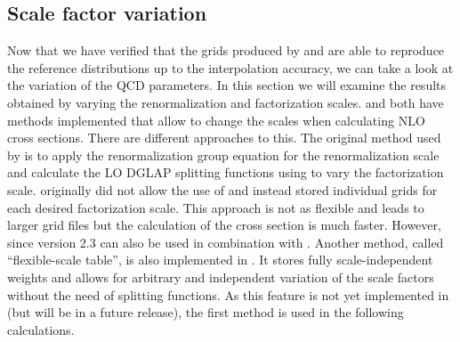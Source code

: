 \subsection{Scale factor variation}
\label{sec:scalesvar}
Now that we have verified that the grids produced by \appl{} and \fnlo{} are able to reproduce the reference distributions up to the interpolation accuracy, we can take a look at the variation of the QCD parameters.
In this section we will examine the results obtained by varying the renormalization and factorization scales.
\appl{} and \fnlo{} both have methods implemented that allow to change the scales when calculating NLO cross sections.
There are different approaches to this.
The original method used by \appl{} is to apply the renormalization group equation for the renormalization scale and calculate the LO DGLAP splitting functions using \hoppet{} \cite{hoppet} to vary the factorization scale.
\fnlo{} originally did not allow the use of \hoppet{} and instead stored individual grids for each desired factorization scale.
This approach is not as flexible and leads to larger grid files but the calculation of the cross section is much faster.
However, since version 2.3 \fnlo{} can also be used in combination with \hoppet{}.
Another method, called \enquote{flexible-scale table}, is also implemented in \fnlo{}.
It stores fully scale-independent weights and allows for arbitrary and independent variation of the scale factors without the need of splitting functions.
As this feature is not yet implemented in \mcgrid{} (but will be in a future release), the first method is used in the following calculations.


